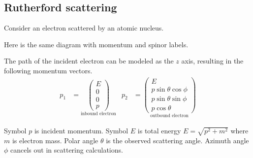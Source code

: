 \documentclass[12pt]{article}
\begin{document}
\subsection*{Rutherford scattering}
Consider an electron scattered by an atomic nucleus.
\begin{center}
\end{center}

Here is the same diagram with momentum and spinor labels.
\begin{center}
\end{center}

The path of the incident electron can be modeled as the $z$ axis,
resulting in the following momentum vectors.
\begin{align*}
p_1&=
\underset{\text{inbound electron}}
{
\begin{pmatrix}E\\0\\0\\p\end{pmatrix}
}
&
p_2&=
\underset{\text{outbound electron}}
{
\begin{pmatrix}
E\\
p\sin\theta\cos\phi\\
p\sin\theta\sin\phi\\
p\cos\theta
\end{pmatrix}
}
\end{align*}

Symbol $p$ is incident momentum.
Symbol $E$ is total energy $E=\sqrt{p^2+m^2}$ where $m$ is electron mass.
Polar angle $\theta$ is the observed scattering angle.
Azimuth angle $\phi$ cancels out in scattering calculations.
\end{document}
